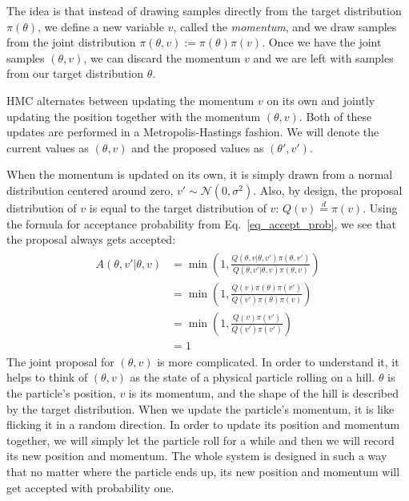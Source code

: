 \documentclass[12pt]{article}
\begin{document}
The idea is that instead of drawing samples directly from the target distribution $\pi(\theta)$, we define a new variable $v$, called the \textit{momentum}, and we draw samples from the joint distribution $\pi(\theta, v) := \pi(\theta)\pi(v)$. Once we have the joint samples $(\theta, v)$, we can discard the momentum $v$ and we are left with samples from our target distribution $\theta$.

HMC alternates between updating the momentum $v$ on its own and jointly updating the position together with the momentum $(\theta, v)$. Both of these updates are performed in a Metropolis-Hastings fashion. We will denote the current values as $(\theta, v)$ and the proposed values as $(\theta', v')$.

When the momentum is updated on its own, it is simply drawn from a normal distribution centered around zero, $v' \sim \mathcal{N}(0, \sigma^2)$. Also, by design, the proposal distribution of $v$ is equal to the target distribution of $v$: $Q(v) \overset{d}{=} \pi(v)$. Using the formula for acceptance probability from Eq.\ \ref{eq_accept_prob}, we see that the proposal always gets accepted:
\begin{align}
\begin{split}
A(\theta,v'|\theta,v) &= \min \left(1, \frac{Q(\theta,v|\theta,v')\pi(\theta,v')}{Q(\theta,v'|\theta,v)\pi(\theta,v)} \right) \\
&= \min \left(1, \frac{Q(v)\pi(\theta)\pi(v')}{Q(v')\pi(\theta)\pi(v)} \right) \\
&= \min \left(1, \frac{Q(v)\pi(v')}{Q(v')\pi(v')} \right) \\
&= 1
\end{split}
\end{align}
The joint proposal for $(\theta, v)$ is more complicated. In order to understand it, it helps to think of $(\theta, v)$ as the state of a physical particle rolling on a hill. $\theta$ is the particle's position, $v$ is its momentum, and the shape of the hill is described by the target distribution. When we update the particle's momentum, it is like flicking it in a random direction. In order to update its position and momentum together, we will simply let the particle roll for a while and then we will record its new position and momentum. The whole system is designed in such a way that no matter where the particle ends up, its new position and momentum will get accepted with probability one.
\end{document}
